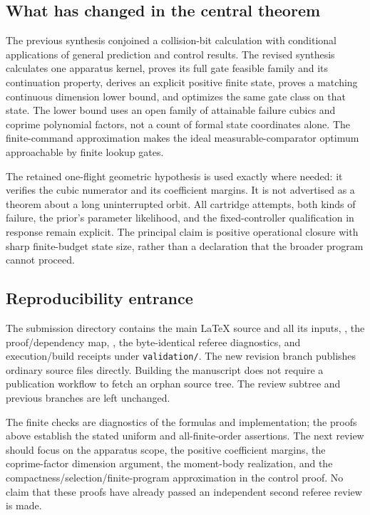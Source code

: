 \subsection{What has changed in the central theorem}
The previous synthesis conjoined a collision-bit calculation with conditional
applications of general prediction and control results. The revised
synthesis calculates one apparatus kernel, proves its full gate feasible
family and its continuation property, derives an explicit positive finite
state, proves a matching continuous dimension lower bound, and optimizes
the same gate class on that state. The lower bound uses an open family of
attainable failure cubics and coprime polynomial factors, not a count of
formal state coordinates alone. The finite-command approximation makes the
ideal measurable-comparator optimum approachable by finite lookup gates.

The retained one-flight geometric hypothesis is used exactly where needed:
it verifies the cubic numerator and its coefficient margins. It is not
advertised as a theorem about a long uninterrupted orbit. All cartridge
attempts, both kinds of failure, the prior's parameter likelihood, and the
fixed-controller qualification in response remain explicit. The principal
claim is positive operational closure with sharp finite-budget state
size, rather than a declaration that the broader program cannot proceed.

\subsection{Reproducibility entrance}
The submission directory contains the main LaTeX source and all its inputs,
, the proof/dependency map,
, the byte-identical referee diagnostics,
and execution/build receipts under \texttt{validation/}. The new revision
branch publishes ordinary source files directly. Building the manuscript
does not require a publication workflow to fetch an orphan source tree.
The review subtree and previous branches are left unchanged.

The finite checks are diagnostics of the formulas and implementation; the
proofs above establish the stated uniform and all-finite-order assertions.
The next review should focus on the apparatus scope, the positive coefficient
margins, the coprime-factor dimension argument, the moment-body realization,
and the compactness/selection/finite-program approximation in the control
proof. No claim that these proofs have already passed an independent second
referee review is made.
